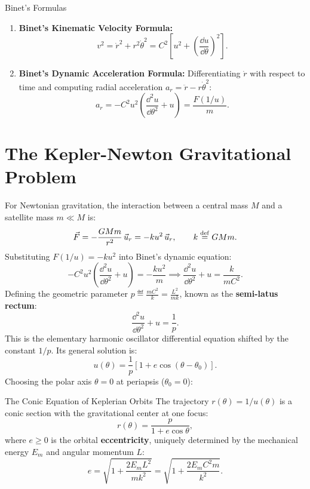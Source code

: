 \begin{lawbox}{Binet's Formulas}
\begin{enumerate}[leftmargin=1.5em,itemsep=3pt]
  \item \textbf{Binet's Kinematic Velocity Formula:}
  \begin{equation}
  v^2 = \dot{r}^2 + r^2\dot{\theta}^2 = C^2 \left[ u^2 + \left(\frac{\dd u}{\dd\theta}\right)^2 \right].
  \end{equation}
  \item \textbf{Binet's Dynamic Acceleration Formula:}
  Differentiating $\dot{r}$ with respect to time and computing radial acceleration $a_r = \ddot{r} - r\dot{\theta}^2$:
  \begin{equation}
  a_r = -C^2 u^2 \left( \frac{\dd^2 u}{\dd\theta^2} + u \right) = \frac{F(1/u)}{m}.
  \end{equation}
\end{enumerate}
\end{lawbox}

\section{The Kepler-Newton Gravitational Problem}

For Newtonian gravitation, the interaction between a central mass $M$ and a satellite mass $m \ll M$ is:
\begin{equation}
\vec{F} = -\frac{G M m}{r^2}\,\vec{u}_r = -k u^2\,\vec{u}_r, \qquad k \overset{\mathrm{def}}{=} G M m.
\end{equation}
Substituting $F(1/u) = -k u^2$ into Binet's dynamic equation:
\[
-C^2 u^2 \left( \frac{\dd^2 u}{\dd\theta^2} + u \right) = -\frac{k u^2}{m} \implies \frac{\dd^2 u}{\dd\theta^2} + u = \frac{k}{m C^2}.
\]
Defining the geometric parameter $p \eqdef \frac{m C^2}{k} = \frac{L^2}{m k}$, known as the \textbf{semi-latus rectum}:
\begin{equation}
\frac{\dd^2 u}{\dd\theta^2} + u = \frac{1}{p}.
\end{equation}
This is the elementary harmonic oscillator differential equation shifted by the constant $1/p$. Its general solution is:
\begin{equation}
u(\theta) = \frac{1}{p}\left[ 1 + e \cos(\theta - \theta_0) \right].
\end{equation}
Choosing the polar axis $\theta = 0$ at periapsis ($\theta_0 = 0$):

\begin{lawbox}{The Conic Equation of Keplerian Orbits}
The trajectory $r(\theta) = 1/u(\theta)$ is a conic section with the gravitational center at one focus:
\begin{equation}
r(\theta) = \frac{p}{1 + e \cos\theta},
\end{equation}
where $e \ge 0$ is the orbital \textbf{eccentricity}, uniquely determined by the mechanical energy $E_m$ and angular momentum $L$:
\begin{equation}
e = \sqrt{1 + \frac{2 E_m L^2}{m k^2}} = \sqrt{1 + \frac{2 E_m C^2 m}{k^2}}.
\end{equation}
\end{lawbox}

